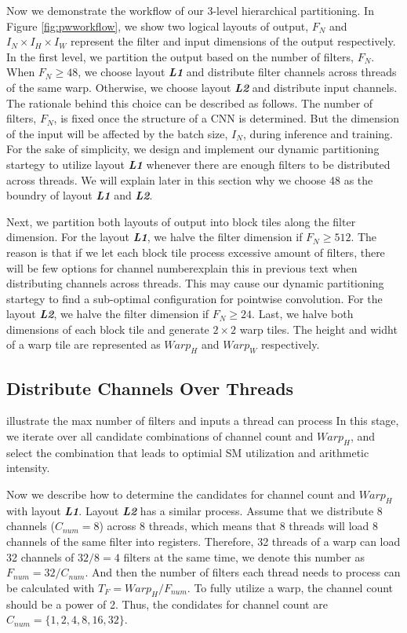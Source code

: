 Now we demonstrate the workflow of our 3-level hierarchical partitioning.
In Figure \ref{fig:pwworkflow}, we show two logical layouts of output, $F_N$ and $I_N \times I_H \times I_W$ represent the filter and input dimensions of the output respectively.
In the first level, we partition the output based on the number of filters, $F_N$.
When $F_N \ge 48$, we choose layout \textbf{\emph{L1}} and distribute filter channels across threads of the same warp. 
Otherwise, we choose layout \textbf{\emph{L2}} and distribute input channels.
The rationale behind this choice can be described as follows. 
The number of filters, $F_N$, is fixed once the structure of a CNN is determined. 
But the dimension of the input will be affected by the batch size, $I_N$, during inference and training.
For the sake of simplicity, we design and implement our dynamic partitioning startegy to utilize layout \textbf{\emph{L1}} whenever there are enough filters to be distributed across threads.
We will explain later in this section why we choose 48 as the boundry of layout \textbf{\emph{L1}} and \textbf{\emph{L2}}.

Next, we partition both layouts of output into block tiles along the filter dimension. 
For the layout \textbf{\emph{L1}}, we halve the filter dimension if $F_N \geq 512$. 
The reason is that if we let each block tile process excessive amount of filters, there will be few options for channel number{\color{red}explain this in previous text} when distributing channels across threads. 
This may cause our dynamic partitioning startegy to find a sub-optimal configuration for pointwise convolution.
For the layout \textbf{\emph{L2}}, we halve the filter dimension if $F_N \geq 24$.
Last, we halve both dimensions of each block tile and generate $2 \times 2$ warp tiles. The height and widht of a warp tile are represented as $Warp_H$ and $Warp_W$ respectively.

\subsection{Distribute Channels Over Threads}
{\color{red}illustrate the max number of filters and inputs a thread can process}
In this stage, we iterate over all candidate combinations of channel count and $Warp_H$, and select the combination that leads to optimial SM utilization and arithmetic intensity.

Now we describe how to determine the candidates for channel count and $Warp_H$ with layout \textbf{\emph{L1}}. Layout \textbf{\emph{L2}} has a similar process.
Assume that we distribute 8 channels ($C_{num}=8$) across 8 threads, which means that 8 threads will load 8 channels of the same filter into registers. 
Therefore, 32 threads of a warp can load 32 channels of $32/8=4$ filters at the same time, we denote this number as $F_{num}=32/C_{num}$.
And then the number of filters each thread needs to process can be calculated with $T_F=Warp_H/F_{num}$.
To fully utilize a warp, the channel count should be a power of 2.
Thus, the condidates for channel count are $C_{num}=\{1,2,4,8,16,32\}$.

